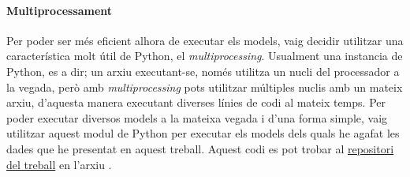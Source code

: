 \paragraph{Multiprocessament}
Per poder ser més eficient alhora de executar els models, vaig decidir utilitzar una característica molt útil de Python, el \textit{multiprocessing}. Usualment una instancia de Python, es a dir; un arxiu executant-se, només utilitza un nucli del processador a la vegada, però amb \textit{multiprocessing} pots utilitzar múltiples nuclis amb un mateix arxiu, d'aquesta manera executant diverses línies de codi al mateix temps. Per poder executar diversos models a la mateixa vegada i d'una forma simple, vaig utilitzar aquest modul de Python per executar els models dels quals he agafat les dades que he presentat en aquest treball. Aquest codi es pot trobar al \href{https://github.com/tomiock/qGAN}{repositori del treball} en l'arxiu . 
